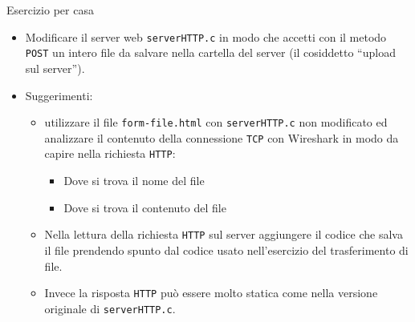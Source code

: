 \documentclass[11pt]{article}
\begin{document}
\begin{tcolorbox}[colback=blue!5!white,colframe=blue!75!black,title=\textbf{DOMANDA}, breakable]
Esercizio per casa
\begin{itemize}
    \item Modificare il server web \texttt{serverHTTP.c} in modo che accetti con il metodo \texttt{POST} un intero file da salvare nella cartella del server (il cosiddetto ``upload sul server'').
    \item Suggerimenti:
    \begin{itemize}
        \item utilizzare il file \texttt{form-file.html} con \texttt{serverHTTP.c} non modificato ed analizzare il contenuto della connessione \texttt{TCP} con Wireshark in modo da capire nella richiesta \texttt{HTTP}:
        \begin{itemize}
            \item Dove si trova il nome del file
            \item Dove si trova il contenuto del file
        \end{itemize}
        \item Nella lettura della richiesta \texttt{HTTP} sul server aggiungere il codice che salva il file prendendo spunto dal codice usato nell'esercizio del trasferimento di file.
        \item Invece la risposta \texttt{HTTP} può essere molto statica come nella versione originale di \texttt{serverHTTP.c}.
    \end{itemize}
\end{itemize}
\end{tcolorbox}
\end{document}
